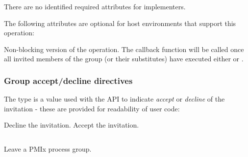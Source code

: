 \reqattrstart
There are no identified required attributes for implementers.

\reqattrend

\optattrstart
The following attributes are optional for host environments that support this operation:


\optattrend

\descr

Non-blocking version of the  operation. The callback function will be called once all invited members of the group (or their substitutes) have executed either  or .

\subsubsection{Group accept/decline directives}

The  type is a  value used with the  \ac{API} to indicate \emph{accept} or \emph{decline} of the invitation - these are provided for readability of user code:

\begin{constantdesc}
%
Decline the invitation.
%
Accept the invitation.
%
\end{constantdesc}


\subsection{}

\summary

Leave a \ac{PMIx} process group.

\format


